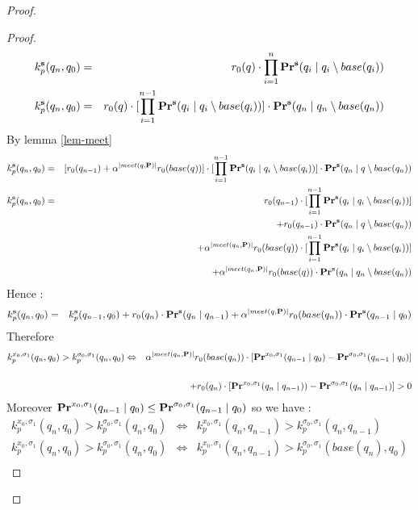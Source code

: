 \begin{proof}
\begin{proof}
	\begin{eqnarray*}
		k^{\mathbf{s}}_p(q_n,q_0) & = & r_0(q)  
		\cdot \prod_{i=1}^{n} \mathbf{Pr}^{\mathbf{s}}(q_{i} \mid q_{i} \setminus base(q_{i}))\\
		k^{\mathbf{s}}_p(q_n,q_0) & = & r_0(q)  
		\cdot [\prod_{i=1}^{n-1} \mathbf{Pr}^{\mathbf{s}}(q_{i} \mid q_{i} \setminus base(q_{i}))] \cdot \mathbf{Pr}^{\mathbf{s}}(q_n \mid q_n \setminus base(q_n)) \\
	\end{eqnarray*}
By lemma \ref{lem-meet}
\begin{eqnarray*}
k^{\mathbf{s}}_p(q_n,q_0) & = & [r_0(q_{n-1})+\alpha^{|meet(q,\mathbf{P})|}r_0(base(q))]  
\cdot [\prod_{i=1}^{n-1} \mathbf{Pr}^{\mathbf{s}}(q_{i} \mid q_{i} \setminus base(q_{i}))] \cdot \mathbf{Pr}^{\mathbf{s}}(q_n \mid q \setminus base(q_n)) \\
k^{\mathbf{s}}_p(q_n,q_0) & = & r_0(q_{n-1})   
\cdot [\prod_{i=1}^{n-1} \mathbf{Pr}^{\mathbf{s}}(q_{i} \mid q_{i} \setminus base(q_{i}))] \\
&& + r_0(q_{n-1}) \cdot \mathbf{Pr}^{\mathbf{s}}(q_n \mid q \setminus base(q_n)) \\
&&+\alpha^{|meet(q_n,\mathbf{P})|}r_0(base(q)) \cdot   
[\prod_{i=1}^{n-1} \mathbf{Pr}^{\mathbf{s}}(q_{i} \mid q_{i} \setminus base(q_{i}))] \\
&& + \alpha^{|meet(q_n,\mathbf{P})|}r_0(base(q)) \cdot \mathbf{Pr}^{\mathbf{s}}(q_n \mid q_n \setminus base(q_n)) \\
\end{eqnarray*}
	Hence  :
	\begin{eqnarray*}
		k^{\mathbf{s}}_p(q_n,q_0) & = & k^{\mathbf{s}}_p(q_{n-1},q_0)  + r_0(q _n) \cdot \mathbf{Pr}^{\mathbf{s}}(q_n \mid q_{n-1})  + \alpha^{|meet(q,\mathbf{P})|}r_0(base(q_n)) \cdot \mathbf{Pr}^{\mathbf{s}}(q_{n-1}\mid q_0)\\
	\end{eqnarray*}
Therefore
\begin{eqnarray*}
	k^{x_0,\sigma_1}_p(q_n,q_0) > k^{\sigma_0,\sigma_1}_p(q_n,q_0) & \Leftrightarrow & \alpha^{|meet(q_n,\mathbf{P})|}r_0(base(q_n)) \cdot  [\mathbf{Pr}^{x_0,\sigma_1}(q_{n-1} \mid q_0) -  \mathbf{Pr}^{\sigma_0,\sigma_1}(q_{n-1} \mid q_0)] \\
	\\ &&+ r_0(q _n) \cdot [\mathbf{Pr}^{x_0,\sigma_1}(q_n \mid q_{n-1})) -  \mathbf{Pr}^{\sigma_0,\sigma_1}(q_n \mid q_{n-1})] > 0\\
\end{eqnarray*}
Moreover $\mathbf{Pr}^{x_0,\sigma_1}(q_{n-1} \mid q_0) \leq \mathbf{Pr}^{\sigma_0,\sigma_1}(q_{n-1} \mid q_0)$ so we have :
\begin{eqnarray*}
	k^{x_0,\sigma_1}_p(q_n,q_0) > k^{\sigma_0,\sigma_1}_p(q_n,q_0) & \Leftrightarrow & k^{x_0,\sigma_1}_p(q_n,q_{n-1}) > k^{\sigma_0,\sigma_1}_p(q_n,q_{n-1}) \\
	k^{x_0,\sigma_1}_p(q_n,q_0) > k^{\sigma_0,\sigma_1}_p(q_n,q_0) & \Leftrightarrow & k^{x_0,\sigma_1}_p(q_n,q_{n-1}) > k^{\sigma_0,\sigma_1}_p(base(q_n),q_{0}) \\
\end{eqnarray*}


\end{proof}
\end{proof}
